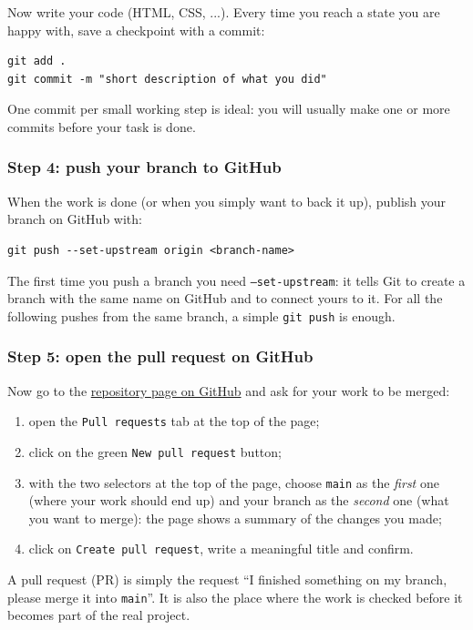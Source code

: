 Now write your code (HTML, CSS, ...). Every time you reach a state you are
happy with, save a checkpoint with a commit:
\begin{verbatim}
git add .
git commit -m "short description of what you did"
\end{verbatim}
One commit per small working step is ideal: you will usually make one or
more commits before your task is done.

\subsubsection{Step 4: push your branch to GitHub}
\label{sec:git-step4}

When the work is done (or when you simply want to back it up), publish your
branch on GitHub with:
\begin{verbatim}
git push --set-upstream origin <branch-name>
\end{verbatim}
The first time you push a branch you need \texttt{--set-upstream}: it tells
Git to create a branch with the same name on GitHub and to connect yours to
it. For all the following pushes from the same branch, a simple
\texttt{git push} is enough.

\subsubsection{Step 5: open the pull request on GitHub}
\label{sec:git-step5}

Now go to the
\href{https://github.com/vittodevit/sa1}{repository page on GitHub}
and ask for your work to be merged:
\begin{enumerate}
\item open the \texttt{Pull requests} tab at the top of the page;
\item click on the green \texttt{New pull request} button;
\item with the two selectors at the top of the page, choose \texttt{main} as
the \emph{first} one (where your work should end up) and your branch as the
\emph{second} one (what you want to merge): the page shows a summary of the
changes you made;
\item click on \texttt{Create pull request}, write a meaningful title and
confirm.
\end{enumerate}

A pull request (PR) is simply the request ``I finished something on my
branch, please merge it into \texttt{main}''. It is also the place where the
work is checked before it becomes part of the real project.


